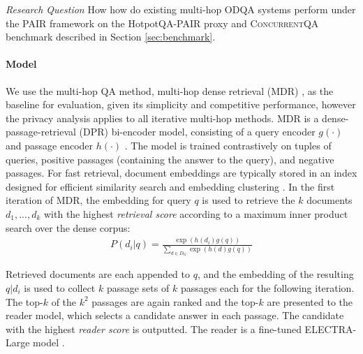 \documentclass{article}
\renewcommand\cite{\citep}	\newcommand\shortcite{\citeyearpar}\newcommand\newcite{\citet}
\newcommand{\datasetname}{\textsc{ConcurrentQA}\xspace}
\newcommand{\problemshortname}{\textsc{PAIR}\xspace}
\begin{document}
\textit{Research Question} How how do existing multi-hop ODQA systems perform under the \problemshortname framework on the HotpotQA-\problemshortname proxy and \datasetname benchmark described in Section \ref{sec:benchmark}.


\paragraph{Model} We use the multi-hop QA method, multi-hop dense retrieval (MDR) \cite{xiong2021mdr}, as the baseline for evaluation, given its simplicity and competitive performance, however the privacy analysis applies to all iterative multi-hop methods. MDR is a dense-passage-retrieval (DPR) bi-encoder model, consisting of a query encoder $g(\cdot)$ and passage encoder $h(\cdot)$ \cite{karpukhin2020dpr}. The model is trained contrastively on tuples of queries, positive passages (containing the answer to the query), and negative passages. For fast retrieval, document embeddings are typically stored in an index designed for efficient similarity search and embedding clustering \cite{faiss2017}. In the first iteration of MDR, the embedding for query $q$ is used to retrieve the $k$ documents $d_1, ..., d_k$ with the highest \textit{retrieval score} according to a maximum inner product search over the dense corpus: 
{\begin{align}
    P(d_i|q) = \frac{\exp(h(d_i)g(q))}{\sum_{d \in D_G} \exp(h(d)g(q))}
\end{align}}

Retrieved documents are each appended to $q$, and the embedding of the resulting $q | d_i$ is used to collect $k$ passage sets of $k$ passages each for the following iteration. The top-$k$ of the $k^2$ passages are again ranked and the top-$k$ are presented to the reader model, which selects a candidate answer in each passage. The candidate with the highest \textit{reader score} is outputted. The reader is a fine-tuned ELECTRA-Large model \cite{clark2020electra}.
\end{document}
